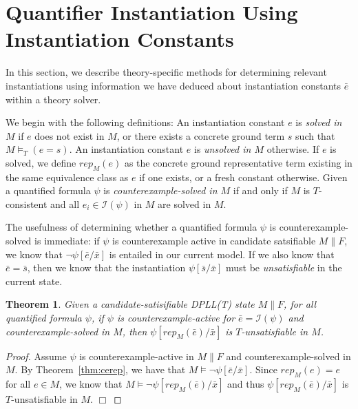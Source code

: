 \documentclass{llncs}
\newtheorem{thm}{Theorem}
\begin{document}
\section{Quantifier Instantiation Using Instantiation Constants}

In this section, we describe theory-specific methods for determining relevant instantiations using information we have deduced about instantiation constants $\bar{e}$ within a theory solver.

We begin with the following definitions:
An instantiation constant $e$ is \emph{solved in $M$} if $e$ does not exist in $M$, or there exists a concrete ground term $s$ such that $M \models_T (e = s)$.
An instantiation constant $e$ is \emph{unsolved in $M$} otherwise.
If $e$ is solved, we define $rep_M( e )$ as the concrete ground representative term existing in the same equivalence class as $e$ if one exists, or a fresh constant otherwise.
Given a quantified formula $\psi$ is \emph{counterexample-solved in $M$} if and only if $M$ is $T$-consistent and all $e_i \in \mathcal{I}( \psi )$ in $M$ are solved in $M$.

The usefulness of determining whether a quantified formula $\psi$ is counterexample-solved is immediate:  if $\psi$ is counterexample active in candidate satsifiable $M \parallel F$, we know that $\neg \psi[ \bar{e}/\bar{x} ]$ is entailed in our current model.
If we also know that $\bar{e} = \bar{s}$, then we know that the instantiation $\psi[ \bar{s}/\bar{x} ]$ must be \emph{unsatisfiable} in the current state.

\begin{thm}
\label{thm:instready}
Given a candidate-satisifiable DPLL(T) state $M \parallel F$, for all quantified formula $\psi$, if $\psi$ is counterexample-active for $\bar{e} = \mathcal{I}( \psi )$ and counterexample-solved in $M$, then $\psi[rep_M( \bar{e} )/\bar{x}]$ is $T$-unsatisfiable in $M$.
\end{thm}
\begin{proof}
Assume $\psi$ is counterexample-active in $M \parallel F$ and counterexample-solved in $M$.
By Theorem~\ref{thm:cerep}, we have that $M \models \neg \psi[\bar{e}/\bar{x}]$.
Since $rep_M( e ) = e$ for all $e \in M$, we know that $M \models \neg \psi[rep_M( \bar{e} )/\bar{x}]$ and thus $\psi[rep_M( \bar{e} )/\bar{x}]$ is $T$-unsatisfiable in $M$. $\Box$
\end{proof}
\end{document}
